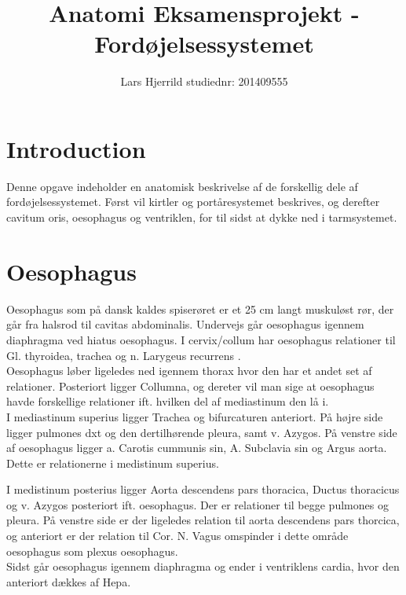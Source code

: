 	
	
	\title{Anatomi Eksamensprojekt - Fordøjelsessystemet}
	\author{Lars Hjerrild studiednr: 201409555}
	
	\maketitle
	\thispagestyle{empty}
	
	\pagebreak
	\section{Introduction}
	Denne opgave indeholder en anatomisk beskrivelse af de forskellig dele af fordøjelsessystemet. Først vil kirtler og portåresystemet beskrives, og derefter cavitum oris, oesophagus og ventriklen, for til sidst at dykke ned i tarmsystemet.\\
	
	
	\section{Oesophagus}
	Oesophagus som på dansk kaldes spiserøret er et 25 cm langt muskuløst rør, der går fra halsrod til cavitas abdominalis. Undervejs går oesophagus igennem diaphragma ved hiatus oesophagus. I cervix/collum har oesophagus relationer til Gl. thyroidea, trachea og n. Larygeus recurrens .\\
	
	Oesophagus løber ligeledes ned igennem thorax hvor den har et andet set af relationer. Posteriort ligger Collumna, og dereter vil man sige at oesophagus havde forskellige relationer ift. hvilken del af mediastinum den lå i.\\
	
	I mediastinum superius ligger Trachea og bifurcaturen anteriort. På højre side ligger pulmones dxt og den dertilhørende pleura, samt v. Azygos. På venstre side af oesophagus ligger a. Carotis cummunis sin, A. Subclavia sin og Argus aorta. Dette er relationerne i medistinum superius.
	
	I medistinum posterius ligger Aorta descendens pars thoracica, Ductus thoracicus og v. Azygos posteriort ift. oesophagus. Der er relationer til begge pulmones og pleura. På venstre side er der ligeledes relation til aorta descendens pars thorcica, og anteriort er der relation til Cor. N. Vagus omspinder i dette område oesophagus som plexus oesophagus.\\
	
	Sidst går oesophagus igennem diaphragma og ender i ventriklens cardia, hvor den anteriort dækkes af Hepa.
	
